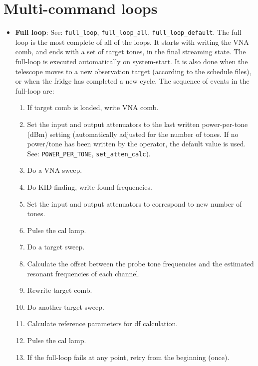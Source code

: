 \section{Multi-command loops}\label{multiloops}
\begin{itemize}[leftmargin=*,label={}]

\item \textbf{Full loop}: See: \texttt{full\_loop}, \texttt{full\_loop\_all}, \texttt{full\_loop\_default}. The full loop is the most complete of all of the loops. It starts with writing the VNA comb, and ends with a set of target tones, in the final streaming state. The full-loop is executed automatically on system-start. It is also done when the telescope moves to a new observation target (according to the schedule files), or when the fridge has completed a new cycle. The sequence of events in the full-loop are:
\begin{enumerate}
  \item If target comb is loaded, write VNA comb.
  \item Set the input and output attenuators to the last written power-per-tone (dBm) setting (automatically adjusted for the number of tones. If no power/tone has been written by the operator, the default value is used. See: \texttt{POWER\_PER\_TONE}, \texttt{set\_atten\_calc}).
  \item Do a VNA sweep.
  \item Do KID-finding, write found frequencies.
  \item Set the input and output attenuators to correspond to new number of tones.
  \item Pulse the cal lamp.
  \item Do a target sweep.
  \item Calculate the offset between the probe tone frequencies and the estimated resonant frequencies of each channel.
  \item Rewrite target comb.
  \item Do another target sweep.
  \item Calculate reference parameters for df calculation.
  \item Pulse the cal lamp.
  \item If the full-loop fails at any point, retry from the beginning (once).
\end{enumerate}


\end{itemize}
